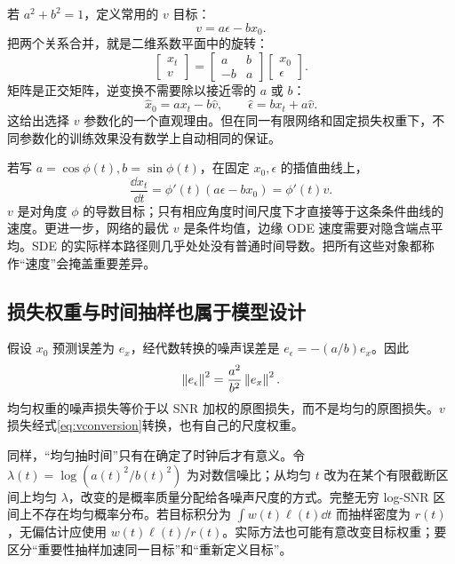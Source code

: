 若 $a^2+b^2=1$，定义常用的 $v$ 目标\cite{r_vpred}：
\begin{equation}
 v=a\epsilon-bx_0.
\end{equation}
把两个关系合并，就是二维系数平面中的旋转：
\begin{equation}
 \begin{bmatrix}x_t\\v\end{bmatrix}
 =\begin{bmatrix}a&b\\-b&a\end{bmatrix}
 \begin{bmatrix}x_0\\\epsilon\end{bmatrix}.
\end{equation}
矩阵是正交矩阵，逆变换不需要除以接近零的 $a$ 或 $b$：
\begin{equation}\boxed{
 \widehat x_0=ax_t-b\widehat v,\qquad
 \widehat\epsilon=bx_t+a\widehat v.
 }\label{eq:vconversion}\end{equation}
这给出选择 $v$ 参数化的一个直观理由。但在同一有限网络和固定损失权重下，不同参数化的训练效果没有数学上自动相同的保证。

若写 $a=\cos\phi(t),b=\sin\phi(t)$，在固定 $x_0,\epsilon$ 的插值曲线上，
\begin{equation}
 \frac{\dd x_t}{\dd t}=\phi'(t)(a\epsilon-bx_0)=\phi'(t)v.
\end{equation}
$v$ 是对角度 $\phi$ 的导数目标；只有相应角度时间尺度下才直接等于这条条件曲线的速度。更进一步，网络的最优 $v$ 是条件均值，边缘 ODE 速度需要对隐含端点平均。SDE 的实际样本路径则几乎处处没有普通时间导数。把所有这些对象都称作“速度”会掩盖重要差异。

\subsection{损失权重与时间抽样也属于模型设计}
假设 $x_0$ 预测误差为 $e_x$，经代数转换的噪声误差是 $e_\epsilon=-(a/b)e_x$。因此
\begin{equation}
 \left\lVert e_\epsilon\right\rVert^2=\frac{a^2}{b^2}\left\lVert e_x\right\rVert^2.
\end{equation}
均匀权重的噪声损失等价于以 SNR 加权的原图损失，而不是均匀的原图损失。$v$ 损失经式\eqref{eq:vconversion}转换，也有自己的尺度权重。

同样，“均匀抽时间”只有在确定了时钟后才有意义。令 $\lambda(t)=\log(a(t)^2/b(t)^2)$ 为对数信噪比；从均匀 $t$ 改为在某个有限截断区间上均匀 $\lambda$，改变的是概率质量分配给各噪声尺度的方式。完整无穷 log-SNR 区间上不存在均匀概率分布。若目标积分为 $\int w(t)\ell(t)\dd t$ 而抽样密度为 $r(t)$，无偏估计应使用 $w(t)\ell(t)/r(t)$。实际方法也可能有意改变目标权重；要区分“重要性抽样加速同一目标”和“重新定义目标”。

